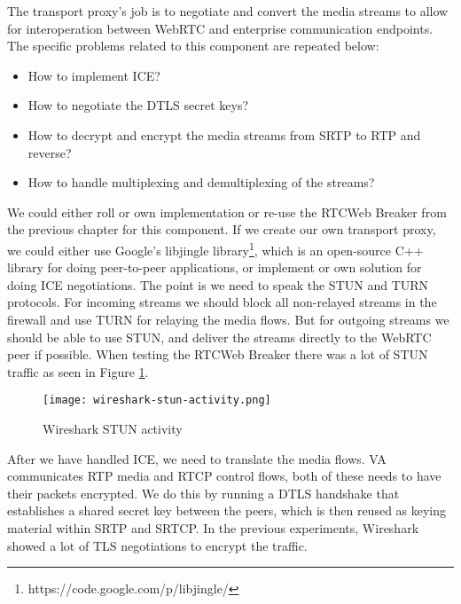 The transport proxy's job is to negotiate and convert the media streams to allow for interoperation between WebRTC and enterprise communication endpoints. The specific problems related to this component are repeated below:

\begin{itemize}
\item{How to implement ICE?}
\item{How to negotiate the DTLS secret keys?}
\item{How to decrypt and encrypt the media streams from SRTP to RTP and reverse?}
\item{How to handle multiplexing and demultiplexing of the streams?}
\end{itemize}


We could either roll or own implementation or re-use the RTCWeb Breaker from the previous chapter for this component. If we create our own transport proxy, we could either use Google's libjingle library\footnote{https://code.google.com/p/libjingle/}, which is an open-source C++ library for doing peer-to-peer applications, or implement or own solution for doing ICE negotiations. The point is we need to speak the STUN and TURN protocols. For incoming streams we should block all non-relayed streams in the firewall and use TURN for relaying the media flows. But for outgoing streams we should be able to use STUN, and deliver the streams directly to the WebRTC peer if possible. When testing the RTCWeb Breaker there was a lot of STUN traffic as seen in Figure \ref{fig:wireshark-stun-activity}.

\begin{figure}[here]
\centerline{\texttt{[image: wireshark-stun-activity.png]}}
\caption{Wireshark STUN activity}
\label{fig:wireshark-stun-activity}
\end{figure}

After we have handled ICE, we need to translate the media flows. VA communicates RTP media and RTCP control flows, both of these needs to have their packets encrypted. We do this by running a DTLS handshake that establishes a shared secret key between the peers, which is then reused as keying material within SRTP and SRTCP. In the previous experiments, Wireshark showed a lot of TLS negotiations to encrypt the traffic.

